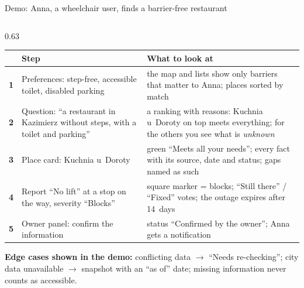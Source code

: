 \begin{frame}{Demo: Anna, a wheelchair user, finds a barrier-free restaurant}
  \begin{columns}[T,onlytextwidth]
    \begin{column}{0.63\textwidth}
      \scriptsize
      \renewcommand{\arraystretch}{1.1}
      \begin{tabularx}{\textwidth}{@{}>{\bfseries\color{accNavy}}c >{\raggedright\arraybackslash}p{30mm} >{\raggedright\arraybackslash}X@{}}
        \toprule
        & \textbf{Step} & \textbf{What to look at} \\
        \midrule
        1 & Preferences: step-free, accessible toilet, disabled parking &
            the map and lists show only barriers that matter to Anna; places sorted by match \\
        2 & Question: “a restaurant in Kazimierz without steps, with a toilet and parking” &
            a ranking with reasons: Kuchnia u~Doroty on top meets everything; for the others you see what is \emph{unknown} \\
        3 & Place card: Kuchnia u~Doroty &
            green “Meets all your needs”; every fact with its source, date and status; gaps named as such \\
        4 & Report “No lift” at a stop on the way, severity “Blocks” &
            square marker = blocks; “Still there” / “Fixed” votes; the outage expires after 14~days \\
        5 & Owner panel: confirm the information &
            status “Confirmed by the owner”; Anna gets a notification \\
        \bottomrule
      \end{tabularx}

      \vspace{1.5mm}
      \textbf{Edge cases shown in the demo:} conflicting data $\rightarrow$ “Needs re-checking”;
      city data unavailable $\rightarrow$ snapshot with an “as of” date; missing information never counts as accessible.


\end{column}
\end{columns}
\end{frame}
